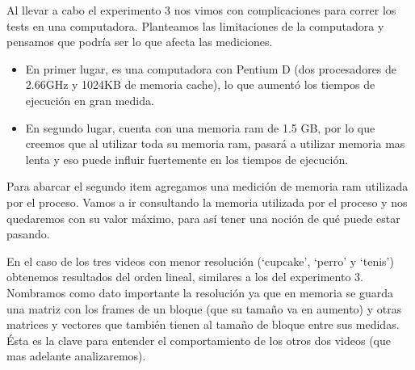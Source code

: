 \par Al llevar a cabo el experimento 3 nos vimos con complicaciones para correr los tests en una computadora. Planteamos las limitaciones de la computadora y pensamos que podr\'ia ser lo que afecta las mediciones.
\begin{itemize}
	\item En primer lugar, es una computadora con Pentium D (dos procesadores de 2.66GHz y 1024KB de memoria cache), lo que aument\'o los tiempos de ejecuci\'on en gran medida.
	\item En segundo lugar, cuenta con una memoria ram de 1.5 GB, por lo que creemos que al utilizar toda su memoria ram, pasar\'a a utilizar memoria mas lenta y eso puede influir fuertemente en los tiempos de ejecuci\'on.
\end{itemize}
\par Para abarcar el segundo item agregamos una medici\'on de memoria ram utilizada por el proceso. Vamos a ir consultando la memoria utilizada por el proceso y nos quedaremos con su valor m\'aximo, para as\'i tener una noci\'on de qu\'e puede estar pasando.

\begin{figure}[ht]
	\begin{center}
	\end{center}
\end{figure}
\FloatBarrier
\par En el caso de los tres videos con menor resoluci\'on (`cupcake', `perro' y `tenis') obtenemos resultados del orden lineal, similares a los del experimento 3. Nombramos como dato importante la resoluci\'on ya que en memoria se guarda una matriz con los frames de un bloque (que su tama\~no va en aumento) y otras matrices y vectores que tambi\'en tienen al tama\~no de bloque entre sus medidas. \'Esta es la clave para entender el comportamiento de los otros dos videos (que mas adelante analizaremos).

